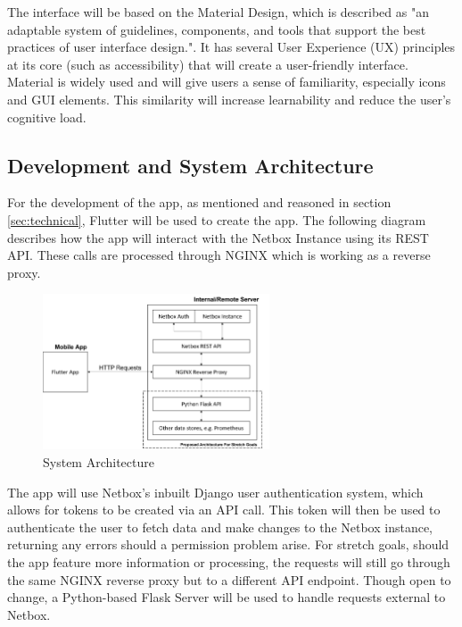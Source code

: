 \documentclass [11pt,a4paper]{article}
\begin{document}
The interface will be based on the Material Design, which is described as "an adaptable system of guidelines, components, and tools that support the best practices of user interface design."\cite{materialDesign}. It has several User Experience (UX) principles at its core (such as accessibility) that will create a user-friendly interface. Material is widely used and will give users a sense of familiarity, especially icons and GUI elements. This similarity will increase learnability and reduce the user's cognitive load.

\subsection{Development and System Architecture}
\label{sec:development} 
For the development of the app, as mentioned and reasoned in section \ref{sec:technical}, Flutter will be used to create the app. The following diagram describes how the app will interact with the Netbox Instance using its REST API. These calls are processed through NGINX which is working as a reverse proxy.

\begin{figure}[H]
    \centering
    \includegraphics[width=0.6\textwidth]{images/top-level-archi.png}
    \caption{System Architecture}
    \label{fig:architecture}
\end{figure}

The app will use Netbox's inbuilt Django user authentication system, which allows for tokens to be created via an API call. This token will then be used to authenticate the user to fetch data and make changes to the Netbox instance, returning any errors should a permission problem arise. For stretch goals, should the app feature more information or processing, the requests will still go through the same NGINX reverse proxy but to a different API endpoint. Though open to change, a Python-based Flask Server will be used to handle requests external to Netbox. 
\end{document}
